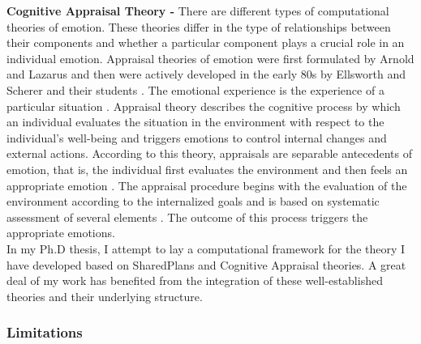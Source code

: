 \documentclass[a4paper, 10pt]{article}
\begin{document}
\begin{small}
\textbf{Cognitive Appraisal Theory -} There are different types of computational
theories of emotion. These theories differ in the type of relationships between
their components and whether a particular component plays a crucial role in an
individual emotion. Appraisal theories of emotion were first formulated by Arnold
\cite{arnold:emotion-personality} and Lazarus \cite{lazarus:emotion-adaptation}
and then were actively developed in the early 80s by Ellsworth and Scherer and
their students \cite{roseman:appraisal-theory,
sander:systems-approach-appraisal, scherer:nature-function-emotion,
scherer:emotions-emergent, scherer:appraisal-processes}. The emotional
experience is the experience of a particular situation \cite{frijda:emotions}.
Appraisal theory describes the cognitive process by which an individual
evaluates the situation in the environment with respect to the individual's
well-being and triggers emotions to control internal changes and external
actions. According to this theory, appraisals are separable antecedents of
emotion, that is, the individual first evaluates the environment and then feels
an appropriate emotion \cite{scherer:appraisal-processes}. The appraisal
procedure begins with the evaluation of the environment according to the
internalized goals and is based on systematic assessment of several elements
\cite{scherer:sequential-appraisal-process}. The outcome of this process
triggers the appropriate emotions.\\


In my Ph.D thesis, I attempt to lay a computational framework for the theory I
have developed based on SharedPlans and Cognitive Appraisal theories. A great
deal of my work has benefited from the integration of these well-established
theories and their underlying structure.

\subsubsection*{Limitations}


\end{small}
\end{document}
